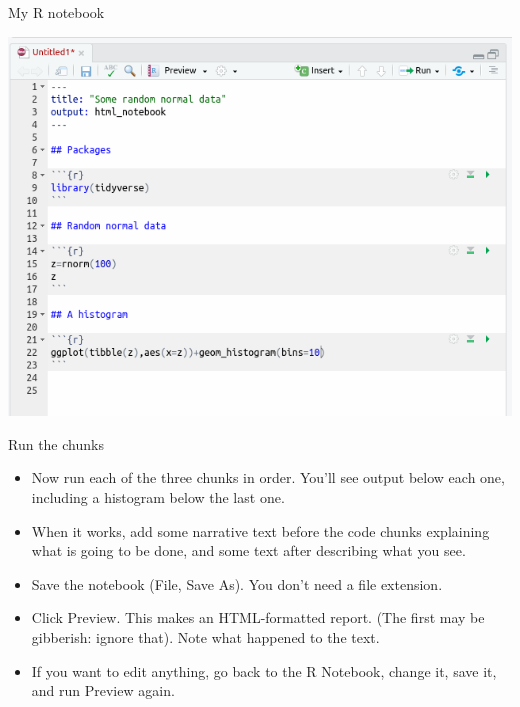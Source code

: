 \documentclass[ignorenonframetext,]{beamer}
\providecommand{\tightlist}{%
  \setlength{\itemsep}{0pt}\setlength{\parskip}{0pt}}
\begin{document}
\begin{frame}{My R notebook}
\protect\hypertarget{my-r-notebook}{}

\includegraphics{Screenshot_2018-06-29_17-04-43.png}

\end{frame}

\begin{frame}{Run the chunks}
\protect\hypertarget{run-the-chunks}{}

\begin{itemize}
\tightlist
\item
  Now run each of the three chunks in order. You'll see output below
  each one, including a histogram below the last one.
\item
  When it works, add some narrative text before the code chunks
  explaining what is going to be done, and some text after describing
  what you see.
\item
  Save the notebook (File, Save As). You don't need a file extension.
\item
  Click Preview. This makes an HTML-formatted report. (The first may be
  gibberish: ignore that). Note what happened to the text.
\item
  If you want to edit anything, go back to the R Notebook, change it,
  save it, and run Preview again.
\end{itemize}

\end{frame}
\end{document}
